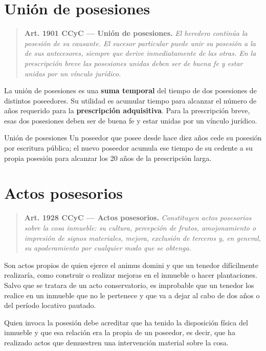 \documentclass[12pt,oneside]{book}
\begin{document}
\section{Unión de posesiones}

\begin{quote}
\textbf{Art. 1901 CCyC --- Unión de posesiones.} \textit{El heredero continúa la posesión de su causante. El sucesor particular puede unir su posesión a la de sus antecesores, siempre que derive inmediatamente de las otras. En la prescripción breve las posesiones unidas deben ser de buena fe y estar unidas por un vínculo jurídico.}
\end{quote}

La unión de posesiones es una \textbf{suma temporal} del tiempo de dos posesiones de distintos poseedores. Su utilidad es acumular tiempo para alcanzar el número de años requerido para la \textbf{prescripción adquisitiva}. Para la prescripción breve, esas dos posesiones deben ser de buena fe y estar unidas por un vínculo jurídico.

\begin{example}{Unión de posesiones}
Un poseedor que posee desde hace diez años cede su posesión por escritura pública; el nuevo poseedor acumula ese tiempo de su cedente a su propia posesión para alcanzar los 20 años de la prescripción larga.
\end{example}

\section{Actos posesorios}

\begin{quote}
\textbf{Art. 1928 CCyC --- Actos posesorios.} \textit{Constituyen actos posesorios sobre la cosa inmueble: su cultura, percepción de frutos, amojonamiento o impresión de signos materiales, mejora, exclusión de terceros y, en general, su apoderamiento por cualquier modo que se obtenga.}
\end{quote}

Son actos propios de quien ejerce el animus domini y que un tenedor difícilmente realizaría, como construir o realizar mejoras en el inmueble o hacer plantaciones. Salvo que se tratara de un acto conservatorio, es improbable que un tenedor los realice en un inmueble que no le pertenece y que va a dejar al cabo de dos años o del período locativo pautado.

Quien invoca la posesión debe acreditar que ha tenido la disposición física del inmueble y que esa relación era la propia de un poseedor, es decir, que ha realizado actos que demuestren una intervención material sobre la cosa.
\end{document}
